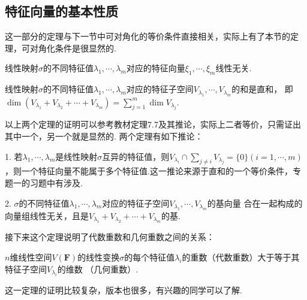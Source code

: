\subsection{特征向量的基本性质}
这一部分的定理与下一节中可对角化的等价条件直接相关，实际上有了本节的定理，可对角化条件是很显然的.
\begin{theorem}
	线性映射$\sigma$的不同特征值$\lambda_1,\cdots,\lambda_m$对应的特征向量$\xi_1,\cdots,\xi_m$线性无关.
\end{theorem}
\begin{theorem}
	线性映射$\sigma$的不同特征值$\lambda_1,\cdots,\lambda_m$对应的特征子空间$V_{\lambda_1},\cdots,V_{\lambda_m}$的和是直和，
	即$\dim(V_{\lambda_1}+V_{\lambda_2}+\cdots+V_{\lambda_m})=\sum_{j=1}^{m}\dim V_{\lambda_j}$.
\end{theorem}
以上两个定理的证明可以参考教材定理7.7及其推论，实际上二者等价，只需证出其中一个，另一个就是显然的.
两个定理有如下推论：

1. 若$\lambda_1,\cdots,\lambda_m$是线性映射$\sigma$互异的特征值，则$V_{\lambda_i}\cap\sum\limits_{j\neq i}V_{\lambda_j}=\{0\}
(i=1,\cdots,m)$，则一个特征向量不能属于多个特征值.这一推论来源于直和的一个等价条件，专题一的习题中有涉及.

2. $\sigma$的不同特征值$\lambda_1,\cdots,\lambda_m$对应的特征子空间$V_{\lambda_1},\cdots,V_{\lambda_m}$的基向量
合在一起构成的向量组线性无关，且是$V_{\lambda_1}+V_{\lambda_2}+\cdots+V_{\lambda_m}$的基.

接下来这个定理说明了代数重数和几何重数之间的关系：
\begin{theorem}
	$n$维线性空间$V(\mathbf{F})$的线性变换$\sigma$的每个特征值$\lambda_i$的重数（代数重数）大于等于其特征子空间$V_{\lambda_i}$的维数
	（几何重数）.
\end{theorem}
这一定理的证明比较复杂，版本也很多，有兴趣的同学可以了解.
